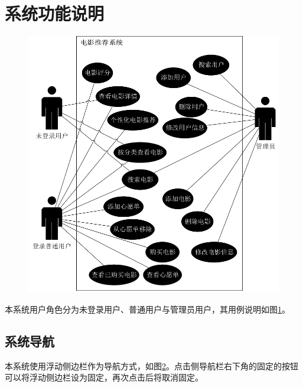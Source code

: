 \documentclass{bjfuthesis}
\begin{document}
\section{系统功能说明}
\begin{figure}
	\includegraphics{figures/use-case.pdf}
	\label{fig:use-case}
\end{figure}
本系统用户角色分为未登录用户、普通用户与管理员用户，其用例说明如图\ref{fig:use-case}。
\subsection{系统导航}
本系统使用浮动侧边栏作为导航方式，如图\ref{fig:admin-navigation}。点击侧导航栏右下角的固定的按钮可以将浮动侧边栏设为固定，再次点击后将取消固定。
\begin{figure}
	\label{fig:admin-navigation}
\end{figure}
\end{document}
